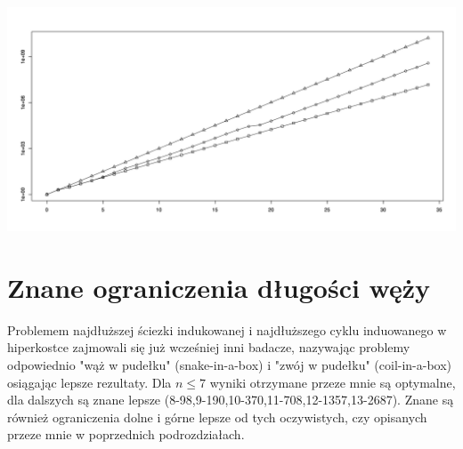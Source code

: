 \documentclass{pracamgr}
\begin{document}
     \begin{center}%
      \includegraphics[scale=0.37]{img/plot1.jpg}
     \end{center}
   \section{Znane ograniczenia długości węży}
    Problemem najdłuższej ściezki indukowanej i najdłuższego cyklu induowanego w hiperkostce zajmowali się już wcześniej inni badacze, nazywając
    problemy odpowiednio "wąż w pudełku" (snake-in-a-box) i "zwój w pudełku" (coil-in-a-box) osiągając lepsze rezultaty.
    Dla $n\le7$ wyniki otrzymane przeze mnie są optymalne, dla dalszych są znane lepsze (8-98,9-190,10-370,11-708,12-1357,13-2687).
    Znane są również ograniczenia dolne i górne lepsze od tych oczywistych, czy opisanych przeze mnie w poprzednich podrozdziałach.
\end{document}
